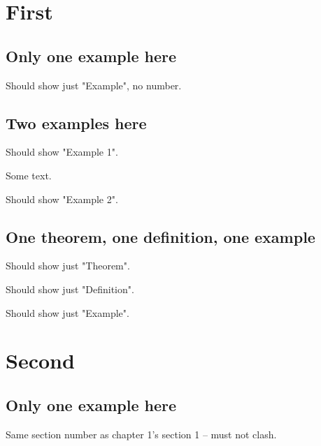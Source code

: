 \documentclass{report}
\begin{document}
	\chapter{First}
	
	\section{Only one example here}
	\begin{example} Should show just "Example", no number. \end{example}
	
	\section{Two examples here}
	\begin{example} Should show "Example 1". \end{example}
	Some text.
	\begin{example} Should show "Example 2". \end{example}
	
	\section{One theorem, one definition, one example}
	\begin{theorem} Should show just "Theorem". \end{theorem}
	\begin{definition} Should show just "Definition". \end{definition}
	\begin{example} Should show just "Example". \end{example}
	
	\chapter{Second}
	\section{Only one example here}
	\begin{example} Same section number as chapter 1's section 1 -- must not clash. \end{example}
\end{document}
